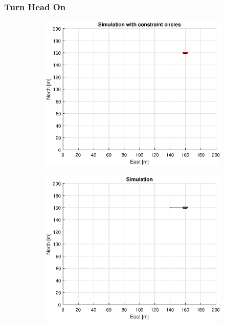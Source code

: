 \subsubsection{Turn Head On}
\clearpage
\begin{figure}[!b] %
    \begin{subfigure}[b]{0.49\textwidth}
        \centering
        \includegraphics[width=\textwidth]{Images/Figures/sving_HO/Simple0_f1_Frame1}
    \end{subfigure}
    \hfill
    \begin{subfigure}[b]{0.499\textwidth}
        \centering
        \includegraphics[width=\textwidth]{Images/Figures/sving_HO/Simple0_f600_Frame1}

\end{subfigure}
\end{figure}
